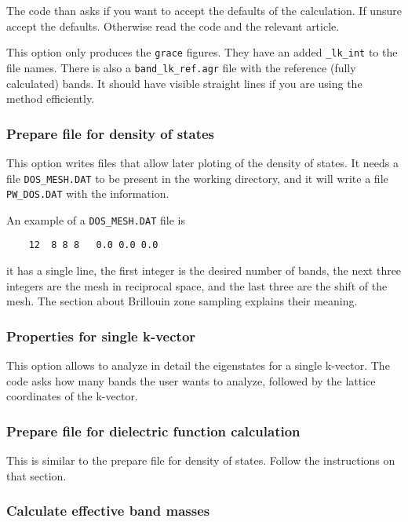 \documentclass[11pt]{article}
\begin{document}
\begin{itemize}
   The code than asks if you want to accept the defaults of the calculation.
   If unsure accept the defaults.  Otherwise read the code and the relevant article.

   This option only produces the \texttt{grace} figures.  They have an added \texttt{\_lk\_int}
   to the file names.  There is also a \texttt{band\_lk\_ref.agr} file with the reference (fully calculated)
   bands.  It should have visible straight lines if you are using the method efficiently.


\end{itemize}

\subsubsection{Prepare file for density of states}

This option writes files that allow later ploting of the density of states.
It needs a file \texttt{DOS\_MESH.DAT} to be present in the working directory,
and it will write a file \texttt{PW\_DOS.DAT} with the information.

An example of a \texttt{DOS\_MESH.DAT} file is
\begin{verbatim}
    12  8 8 8   0.0 0.0 0.0
\end{verbatim}
it has a single line, the first integer is the desired number of bands, the next three integers are
the mesh in reciprocal space, and the last three are the shift of the mesh.
The section about Brillouin zone sampling explains their meaning.

\subsubsection{Properties for single k-vector}

This option allows to analyze in detail the eigenstates for a single k-vector.
The code asks how many bands the user wants to analyze, followed by
the lattice coordinates of the k-vector.

\subsubsection{Prepare file for dielectric function calculation}

This is similar to the prepare file for density of states.  Follow the instructions
on that section.

\subsubsection{Calculate effective band masses}
\end{document}

